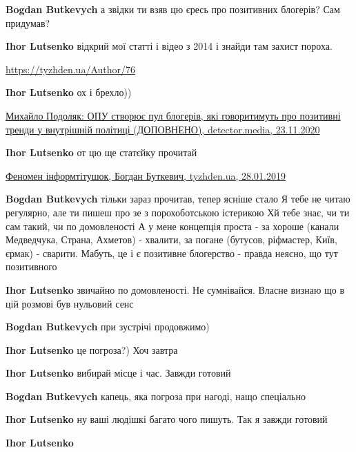 \begin{itemize}
\begin{itemize}
\textbf{Bogdan Butkevych} а звідки ти взяв цю єресь про позитивних блогерів? Сам придумав?

\textbf{Ihor Lutsenko} відкрий мої статті і відео з 2014 і знайди там захист пороха.

\url{https://tyzhden.ua/Author/76}

\textbf{Ihor Lutsenko} ох і брехло))

\href{https://detector.media/community/article/182721/2020-11-23-mykhaylo-podolyak-opu-stvoryuie-pul-blogeriv-yaki-govorytymut-pro-pozytyvni-trendy-u-vnutrishniy-politytsi-dopovneno/}{%
Михайло Подоляк: ОПУ створює пул блогерів, які говоритимуть про позитивні тренди у внутрішній політиці (ДОПОВНЕНО), %
detector.media, 23.11.2020%
}

\textbf{Ihor Lutsenko} от цю ще статєйку прочитай 

\href{https://tyzhden.ua/Columns/50/225932}{%
Феномен інформтітушок, Богдан Буткевич, tyzhden.ua, 28.01.2019%
}

\textbf{Bogdan Butkevych} тільки зараз прочитав, тепер ясніше стало
Я тебе не читаю регулярно, але ти пишеш про зе з порохоботською істерикою
Хй тебе знає, чи ти сам такий, чи по домовленості
А у мене концепція проста - за хороше (канали Медведчука, Страна, Ахметов) - хвалити, за погане (бутусов, ріфмастер, Київ, єрмак) - сварити.
Мабуть, це і є позитивне блогерство - правда неясно, що тут позитивного


\textbf{Ihor Lutsenko} звичайно по домовленості. Не сумнівайся. Власне визнаю що в цій розмові був нульовий сенс

\textbf{Bogdan Butkevych} при зустрічі продовжимо)


\textbf{Ihor Lutsenko} це погроза?) Хоч завтра


\textbf{Ihor Lutsenko} вибирай місце і час. Завжди готовий

\textbf{Bogdan Butkevych} капець, яка погроза
при нагоді, нащо спеціально

\textbf{Ihor Lutsenko} ну ваші людішкі багато чого пишуть. Так я завжди готовий

\textbf{Ihor Lutsenko} 


\end{itemize}
\end{itemize}
